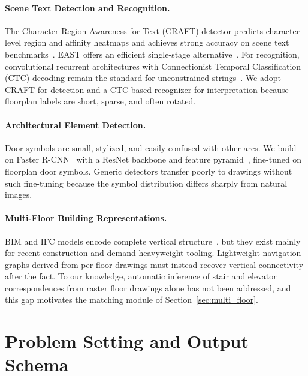 \documentclass[manuscript,screen,review]{acmart}
\begin{document}
\paragraph{Scene Text Detection and Recognition.}
The Character Region Awareness for Text (CRAFT) detector predicts character-level region and affinity heatmaps and achieves strong accuracy on scene text benchmarks~\cite{craft}. EAST offers an efficient single-stage alternative~\cite{east}. For recognition, convolutional recurrent architectures with Connectionist Temporal Classification (CTC) decoding remain the standard for unconstrained strings~\cite{crnn, ctc}. We adopt CRAFT for detection and a CTC-based recognizer for interpretation because floorplan labels are short, sparse, and often rotated.

\paragraph{Architectural Element Detection.}
Door symbols are small, stylized, and easily confused with other arcs. We build on Faster R-CNN~\cite{faster_rcnn} with a ResNet backbone and feature pyramid~\cite{resnet, fpn}, fine-tuned on floorplan door symbols. Generic detectors transfer poorly to drawings without such fine-tuning because the symbol distribution differs sharply from natural images.

\paragraph{Multi-Floor Building Representations.}
BIM and IFC models encode complete vertical structure~\cite{bim_survey, ifc}, but they exist mainly for recent construction and demand heavyweight tooling. Lightweight navigation graphs derived from per-floor drawings must instead recover vertical connectivity after the fact. To our knowledge, automatic inference of stair and elevator correspondences from raster floor drawings alone has not been addressed, and this gap motivates the matching module of Section~\ref{sec:multi_floor}.

\section{Problem Setting and Output Schema}
\label{sec:problem}
\end{document}

